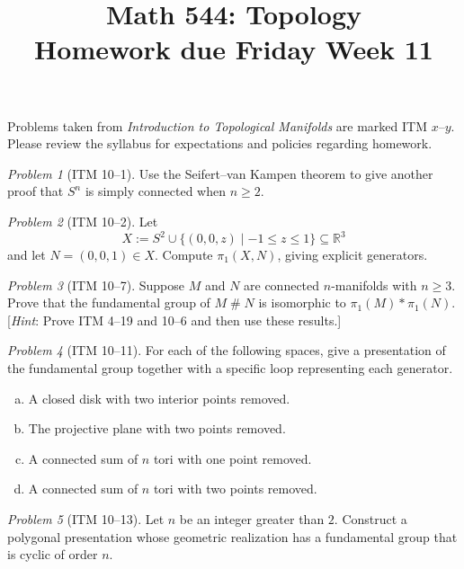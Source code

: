 \documentclass[11pt,twoside]{amsart}
\title{Math 544: Topology\\ Homework due Friday Week 11}
\theoremstyle{plain}
\theoremstyle{remark}
\newtheorem{prob}{Problem}
\theoremstyle{definition}
\theoremstyle{definition}
\newcommand{\RR}{\mathbb{R}}
\newcommand{\cs}{\mathbin{\#}}
\begin{document}
\maketitle

\noindent Problems taken from \emph{Introduction to Topological Manifolds} are marked ITM $x$--$y$. Please review the syllabus for expectations and policies regarding homework.

\begin{prob}[ITM 10--1]
Use the Seifert--van Kampen theorem to give another proof that $S^n$ is simply connected when $n\ge 2$.
\end{prob}

\begin{prob}[ITM 10--2]
Let
\[
  X := S^2 \cup \{(0,0,z)\mid -1\le z\le 1\}\subseteq \RR^3
\]
and let $N = (0,0,1)\in X$. Compute $\pi_1(X,N)$, giving explicit generators.
\end{prob}

\begin{prob}[ITM 10--7]
Suppose $M$ and $N$ are connected $n$-manifolds with $n\ge 3$. Prove that the fundamental group of $M\cs N$ is isomorphic to $\pi_1(M)*\pi_1(N)$. [\emph{Hint}: Prove ITM 4--19 and 10--6 and then use these results.]
\end{prob}

\begin{prob}[ITM 10--11]
For each of the following spaces, give a presentation of the fundamental group together with a specific loop representing each generator.
\begin{enumerate}[(a)]
\item A closed disk with two interior points removed.
\item The projective plane with two points removed.
\item A connected sum of $n$ tori with one point removed.
\item A connected sum of $n$ tori with two points removed.
\end{enumerate}
\end{prob}

\begin{prob}[ITM 10--13]
Let $n$ be an integer greater than $2$. Construct a polygonal presentation whose geometric realization has a fundamental group that is cyclic of order $n$.
\end{prob}
\end{document}
